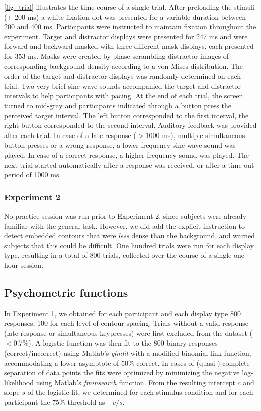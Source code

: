 \documentclass[12pt]{article}
\begin{document}
\autoref{fig_trial} illustrates the time course of a single trial. After preloading the stimuli (+-200 ms) a white fixation dot was presented for a variable duration between 200 and 400 ms. Participants were instructed to maintain fixation throughout the experiment. Target and distractor displays were presented for 247 ms and were forward and backward masked with three different mask displays, each presented for 353 ms. Masks were created by phase-scrambling distractor images of corresponding background density according to a von Mises distribution. The order of the target and distractor displays was randomly determined on each trial. Two very brief sine wave sounds accompanied the target and distractor intervals to help participants with pacing. At the end of each trial, the screen turned to mid-gray and participants indicated through a button press the perceived target interval. The left button corresponded to the first interval, the right button corresponded to the second interval. Auditory feedback was provided after each trial. In case of a late response ($>$1000 ms), multiple simultaneous button presses or a wrong response, a lower frequency sine wave sound was played. In case of a correct response, a higher frequency sound was played. The next trial started automatically after a response was received, or after a time-out period of 1000 ms.

\subsubsection{Experiment 2}
No practice session was run prior to Experiment 2, since subjects were already familiar with the general task. However, we did add the explicit instruction to detect embedded contours that were \emph{less} dense than the background, and warned subjects that this could be difficult. One hundred trials were run for each display type, resulting in a total of 800 trials, collected over the course of a single one-hour session.


\subsection{Psychometric functions}\label{subsection_methods_curves}

In Experiment 1, we obtained for each participant and each display type 800 responses, 100 for each level of contour spacing. Trials without a valid response (late response or simultaneous keypresses) were first excluded from the dataset ($<$0.7\%). A logistic function was then fit to the 800 binary responses (correct/incorrect) using Matlab's \emph{glmfit} with a modified binomial link function, accommodating a lower asymptote of 50\% correct. In cases of (quasi-) complete separation of data points the fits were optimized by minimizing the negative log-likelihood using Matlab's \emph{fminsearch} function. From the resulting intercept $c$ and slope $s$ of the logistic fit, we determined for each stimulus condition and for each participant the 75\%-threshold as $-c/s$.
\end{document}
